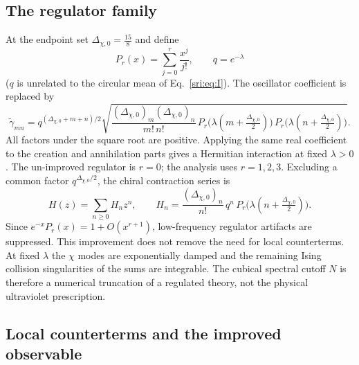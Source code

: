 \subsection{The regulator family}\label{sri:app:cyl:regulator}
At the endpoint set $\Delta_{\chi,0}=\frac{15}{8}$ and define
\begin{equation}
 P_r(x)=\sum_{j=0}^r\frac{x^j}{j!},\qquad q=e^{-\lambda}
\end{equation}
($q$ is unrelated to the circular mean of Eq.~\eqref{sri:eq:I}). The oscillator coefficient is replaced by
\begin{equation}
 \tilde\gamma_{mn}=q^{(\Delta_{\chi,0}+m+n)/2}\sqrt{\frac{(\Delta_{\chi,0})_m(\Delta_{\chi,0})_n}{m!\,n!}\,
 P_r\bigl(\lambda(m+\tfrac{\Delta_{\chi,0}}{2})\bigr)\,P_r\bigl(\lambda(n+\tfrac{\Delta_{\chi,0}}{2})\bigr)}.
 \label{sri:eq:cyl:regc}
\end{equation}
All factors under the square root are positive. Applying the same real coefficient to the creation and annihilation
parts gives a Hermitian interaction at fixed $\lambda>0$. The un-improved regulator is $r=0$; the analysis uses
$r=1,2,3$. Excluding a common factor $q^{\Delta_{\chi,0}/2}$, the chiral contraction series is
\begin{equation}
 H(z)=\sum_{n\ge0}H_nz^n,\qquad
 H_n=\frac{(\Delta_{\chi,0})_n}{n!}\,q^n\,P_r\bigl(\lambda(n+\tfrac{\Delta_{\chi,0}}{2})\bigr).
 \label{sri:eq:cyl:Hseries}
\end{equation}
Since $e^{-x}P_r(x)=1+O(x^{r+1})$, low-frequency regulator artifacts are suppressed. This improvement does not remove
the need for local counterterms. At fixed $\lambda$ the $\chi$ modes are exponentially damped and the remaining Ising
collision singularities of the sums are integrable. The cubical spectral cutoff $N$ is therefore a numerical truncation
of a regulated theory, not the physical ultraviolet prescription.

\subsection{Local counterterms and the improved observable}\label{sri:app:cyl:counterterms}
